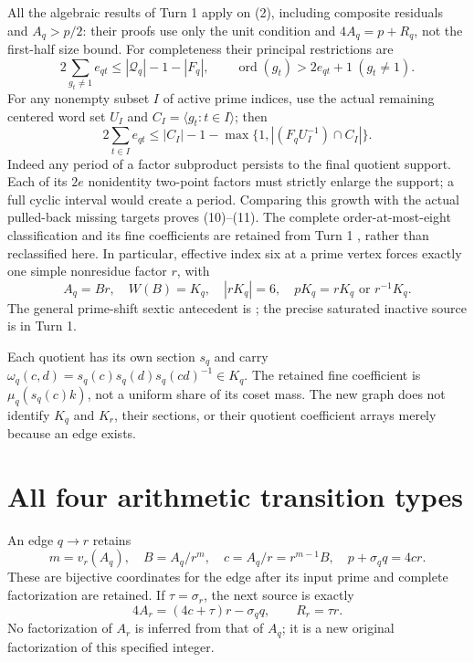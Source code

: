 All the algebraic results of Turn 1 apply on (2), including composite residuals
and $A_q>p/2$: their proofs use only the unit condition and $4A_q=p+R_q$,
not the first-half size bound. For completeness their principal restrictions are
\[
 2\sum_{g_t\ne1}e_{qt}\le|\mathcal Q_q|-1-|F_q|,
 \qquad \operatorname{ord}(g_t)>2e_{qt}+1\ (g_t\ne1).       \tag{10}
\]
For any nonempty subset $I$ of active prime indices, use the actual remaining
centered word set $U_I$ and $C_I=\langle g_t:t\in I\rangle$; then
\[
 2\sum_{t\in I}e_{qt}
 \le |C_I|-1-\max\{1,|(F_qU_I^{-1})\cap C_I|\}.          \tag{11}
\]
Indeed any period of a factor subproduct persists to the final quotient support.
Each of its $2e$ nonidentity two-point factors must strictly enlarge the support;
a full cyclic interval would create a period. Comparing this growth with the
actual pulled-back missing targets proves (10)--(11).
The complete order-at-most-eight classification and its fine coefficients are
retained from Turn 1 \cite[\S\S3--6]{Turn1}, rather than reclassified here.
In particular, effective index six at a prime vertex forces exactly one simple
nonresidue factor $r$, with
\[
 A_q=Br,\quad W(B)=K_q,\quad |rK_q|=6,\quad
 pK_q=rK_q\text{ or }r^{-1}K_q.                          \tag{12}
\]
The general prime-shift sextic antecedent is \cite{BryanSix}; the precise
saturated inactive source is in Turn 1.

Each quotient has its own section $s_q$ and carry
$\omega_q(c,d)=s_q(c)s_q(d)s_q(cd)^{-1}\in K_q$.
The retained fine coefficient is $\mu_q(s_q(c)k)$, not a uniform share of its
coset mass. The new graph does not identify $K_q$ and $K_r$, their sections,
or their quotient coefficient arrays merely because an edge exists.

\section{All four arithmetic transition types}
An edge $q\to r$ retains
\[
 m=v_r(A_q),\quad B=A_q/r^m,\quad c=A_q/r=r^{m-1}B,
 \quad\boxed{p+\sigma_q q=4cr.}                          \tag{13}
\]
These are bijective coordinates for the edge after its input prime and complete
factorization are retained. If $\tau=\sigma_r$, the next source is exactly
\[
 \boxed{4A_r=(4c+\tau)r-\sigma_q q,\qquad R_r=\tau r.}   \tag{14}
\]
No factorization of $A_r$ is inferred from that of $A_q$; it is a new original
factorization of this specified integer.

